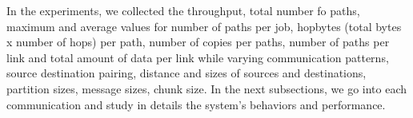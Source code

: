 In the experiments, we collected the throughput, total number fo paths, maximum and average values for number of paths per job, hopbytes (total bytes x number of hops) per path, number of copies per paths, number of paths per link and total amount of data per link while varying communication patterns, source destination pairing, distance and sizes of sources and destinations, partition sizes, message sizes, chunk size.
In the next subsections, we go into each communication and study in details the system's behaviors and performance.




















